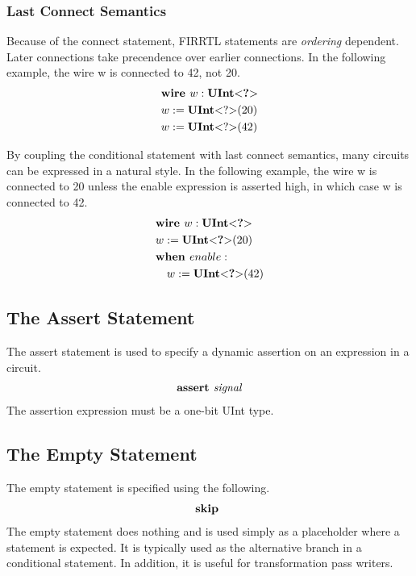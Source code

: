 \documentclass[12pt]{article}
\begin{document}
\subsubsection{Last Connect Semantics}
Because of the connect statement, FIRRTL statements are {\em ordering} dependent.
Later connections take precendence over earlier connections.
In the following example, the wire w is connected to 42, not 20. 
\[
\begin{aligned}
&\text{\bf wire\ } w : \text{\bf UInt}\text{\bf $<$} \text{\bf ?} \text{\bf $>$} \\
&w := \text{\bf UInt}\text{\bf $<$} ? \text{\bf $>$}(20) \\
&w := \text{\bf UInt}\text{\bf $<$} ? \text{\bf $>$}(42) \\
\end{aligned}
\]

By coupling the conditional statement with last connect semantics, many circuits can be expressed in a natural style.
In the following example, the wire w is connected to 20 unless the enable expression is asserted high, in which case w is connected to 42. 
\[
\begin{aligned}
&\text{\bf wire\ } w : \text{\bf UInt}\text{\bf $<$} \text{\bf ?} \text{\bf $>$} \\
&w := \text{\bf UInt}\text{\bf $<$} \text{\bf ?} \text{\bf $>$}(20) \\
&\text{\bf when\ } enable : \\
&\quad w := \text{\bf UInt}\text{\bf $<$} \text{\bf ?} \text{\bf $>$}(42) \\
\end{aligned}
\]

\subsection{The Assert Statement}
The assert statement is used to specify a dynamic assertion on an expression in a circuit.
\[
\begin{aligned}
\text{\bf assert\ } \text{\em signal}
\end{aligned}
\]
The assertion expression must be a one-bit UInt type.

\subsection{The Empty Statement}
The empty statement is specified using the following.
\[
\begin{aligned}
\text{\bf skip\ }
\end{aligned}
\]
The empty statement does nothing and is used simply as a placeholder where a statement is expected.
It is typically used as the alternative branch in a conditional statement. 
In addition, it is useful for transformation pass writers.
\end{document}
